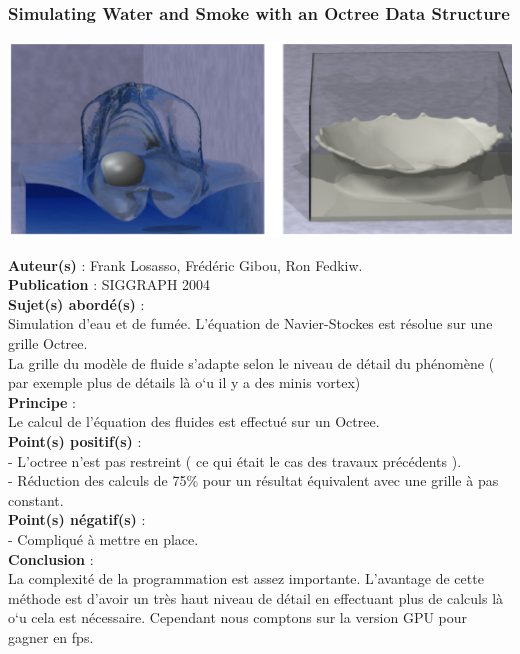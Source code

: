 \documentclass[a4paper,10pt]{article}
\begin{document}
\subsubsection{Simulating Water and Smoke with an Octree Data Structure}
    \begin{center}
	\includegraphics[scale=0.5]{Octree.ps}
    \end{center}
\textbf{Auteur(s)} : Frank Losasso, Frédéric Gibou, Ron Fedkiw.\\
\textbf{Publication} : SIGGRAPH 2004\\
\textbf{Sujet(s) abordé(s)} : \\
	Simulation d'eau et de fumée. L'équation de Navier-Stockes est résolue sur une grille Octree.\\
	La grille du modèle de fluide s'adapte selon le niveau de détail du phénomène ( par exemple plus de détails là o`u il y a des minis vortex)\\
\textbf{Principe} :\\	
	Le calcul de l'équation des fluides est effectué sur un Octree.\\
\textbf{Point(s) positif(s)} :\\
	- L'octree n'est pas restreint ( ce qui était le cas des travaux précédents ).\\
	- Réduction des calculs de 75\% pour un résultat équivalent avec une grille à pas constant.\\
\textbf{Point(s) négatif(s)} :\\
	- Compliqué à mettre en place.\\
\textbf{Conclusion} :\\
	La complexité de la programmation est assez importante. L'avantage de cette méthode est d'avoir un très haut niveau de détail en effectuant plus de calculs là o`u cela est nécessaire. Cependant nous comptons sur la version GPU pour gagner en fps.
\end{document}
